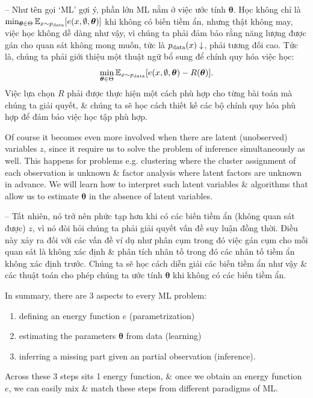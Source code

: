 \documentclass{article}
\begin{document}
-- Như tên gọi `ML' gợi ý, phần lớn ML nằm ở việc ước tính $\boldsymbol{\theta}$. Học không chỉ là $\min_{\boldsymbol{\theta}\in\Theta} \mathbb{E}_{x\sim p_{\rm data}}[e(x,\emptyset,\boldsymbol{\theta})]$ khi không có biến tiềm ẩn, nhưng thật không may, việc học không dễ dàng như vậy, vì chúng ta phải đảm bảo rằng năng lượng được gán cho quan sát không mong muốn, tức là $p_{\rm data}(x)\downarrow$, phải tương đối cao. Tức là, chúng ta phải giới thiệu một thuật ngữ bổ sung để chính quy hóa việc học:
\begin{equation*}
	\min_{\boldsymbol{\theta}\in\Theta} \mathbb{E}_{x\sim p_{\rm data}}[e(x,\emptyset,\boldsymbol{\theta}) - R(\boldsymbol{\theta})].
\end{equation*}
Việc lựa chọn $R$ phải được thực hiện một cách phù hợp cho từng bài toán mà chúng ta giải quyết, \& chúng ta sẽ học cách thiết kế các bộ chính quy hóa phù hợp để đảm bảo việc học tập phù hợp.

Of course it becomes even more involved when there are latent (unobserved) variables $z$, since it require us to solve the problem of inference simultaneously as well. This happens for problems e.g. clustering where the cluster assignment of each observation is unknown \& factor analysis where latent factors are unknown in advance. We will learn how to interpret such latent variables \& algorithms that allow us to estimate $\boldsymbol{\theta}$ in the absence of latent variables.

-- Tất nhiên, nó trở nên phức tạp hơn khi có các biến tiềm ẩn (không quan sát được) $z$, vì nó đòi hỏi chúng ta phải giải quyết vấn đề suy luận đồng thời. Điều này xảy ra đối với các vấn đề ví dụ như phân cụm trong đó việc gán cụm cho mỗi quan sát là không xác định \& phân tích nhân tố trong đó các nhân tố tiềm ẩn không xác định trước. Chúng ta sẽ học cách diễn giải các biến tiềm ẩn như vậy \& các thuật toán cho phép chúng ta ước tính $\boldsymbol{\theta}$ khi không có các biến tiềm ẩn.

In summary, there are 3 aspects to every ML problem:
\begin{enumerate}
	\item defining an energy function $e$ (parametrization)
	\item estimating the parameters $\boldsymbol{\theta}$ from data (learning)
	\item inferring a missing part given an partial observation (inference).
\end{enumerate}
Across these 3 steps sits 1 energy function, \& once we obtain an energy function $e$, we can easily mix \& match these steps from different paradigms of ML.
\end{document}
